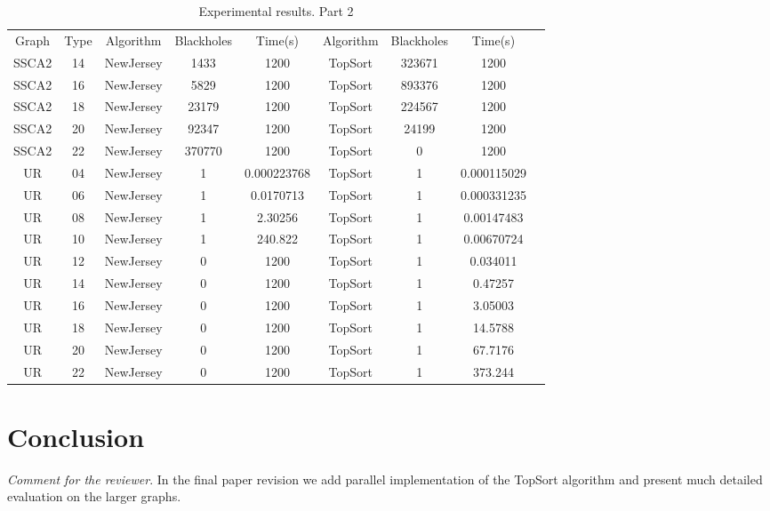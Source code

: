 \documentclass{svproc}
\begin{document}
\begin{table}[]
\caption{Experimental results. Part 2}
\label{tabular:tableresults2}
\begin{center}
\begin{tabular}{c|c|c|c|c|c|c|c|c}
Graph & Type & Algorithm & Blackholes & Time(s) & Algorithm & Blackholes & Time(s) \\
SSCA2 & 14 & NewJersey & 1433 & 1200 & TopSort & 323671 & 1200 \\
SSCA2 & 16 & NewJersey & 5829 & 1200 & TopSort & 893376 & 1200 \\
SSCA2 & 18 & NewJersey & 23179 & 1200 & TopSort & 224567 & 1200 \\
SSCA2 & 20 & NewJersey & 92347 & 1200 & TopSort & 24199 & 1200 \\
SSCA2 & 22 & NewJersey & 370770 & 1200 & TopSort & 0 & 1200 \\
UR & 04 & NewJersey & 1 & 0.000223768 & TopSort & 1 & 0.000115029 \\
UR & 06 & NewJersey & 1 & 0.0170713 & TopSort & 1 & 0.000331235 \\
UR & 08 & NewJersey & 1 & 2.30256 & TopSort & 1 & 0.00147483 \\
UR & 10 & NewJersey & 1 & 240.822 & TopSort & 1 & 0.00670724 \\
UR & 12 & NewJersey & 0 & 1200 & TopSort & 1 & 0.034011 \\
UR & 14 & NewJersey & 0 & 1200 & TopSort & 1 & 0.47257 \\
UR & 16 & NewJersey & 0 & 1200 & TopSort & 1 & 3.05003 \\
UR & 18 & NewJersey & 0 & 1200 & TopSort & 1 & 14.5788 \\
UR & 20 & NewJersey & 0 & 1200 & TopSort & 1 & 67.7176 \\
UR & 22 & NewJersey & 0 & 1200 & TopSort & 1 & 373.244
\end{tabular}
\end{center}
\end{table}


\pagebreak
%

%
\section{Conclusion}

\textit{Comment for the reviewer}. In the final paper revision we add parallel implementation of the TopSort algorithm and present much detailed evaluation on the larger graphs. 

%
%


\end{document}
